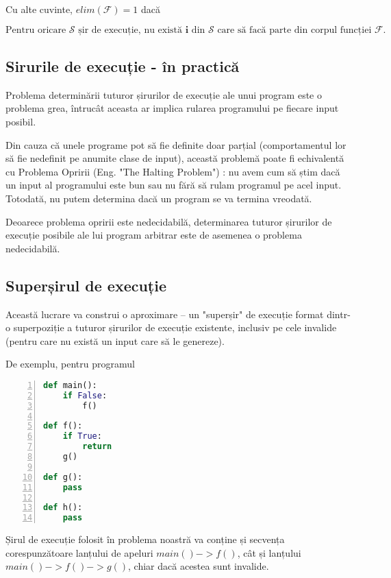 Cu alte cuvinte, $elim(\mathcal{F}) = 1$ dacă

\[
	\text{Pentru oricare } \mathcal{S} \text{ șir de execuție, nu
		există } \mathbf{i} \text{ din } \mathcal{S} \text { care să facă
		parte din corpul funcției } \mathcal{F}.
\]

\subsection{Sirurile de execuție - în practică}

Problema determinării tuturor șirurilor de execuție ale unui
program este o problema grea, întrucât aceasta ar implica rularea
programului pe fiecare input posibil.

Din cauza că unele programe pot să fie definite doar parțial
(comportamentul lor să fie nedefinit pe anumite clase de input),
această problemă poate fi echivalentă cu Problema Opririi (Eng. "The
Halting Problem") \cite{the_halting_problem}: nu avem cum să știm
dacă un input al programului este bun sau nu fără să rulam
programul pe acel input. Totodată, nu putem determina dacă un program se va termina
vreodată.

Deoarece problema opririi este nedecidabilă, determinarea tuturor
șirurilor de execuție posibile ale lui program arbitrar este de
asemenea o problema nedecidabilă.

\subsection{Superșirul de execuție}\label{supersirul_de_executie}

Această lucrare va construi o aproximare -- un "superșir" de execuție format
dintr-o superpoziție a tuturor șirurilor de execuție existente, inclusiv pe cele
invalide (pentru care nu există un input care să le genereze).

De exemplu, pentru programul
\begin{lstlisting}[language=Python, numbers=left]
def main():
    if False:
        f()

def f():
    if True:
        return
    g()

def g():
    pass

def h():
    pass
\end{lstlisting}

Șirul de execuție folosit în problema noastră va conține și
secvența corespunzătoare lanțului de apeluri \(main() -> f()\),
cât și lanțului \(main() -> f() -> g()\),
chiar dacă acestea sunt invalide.

